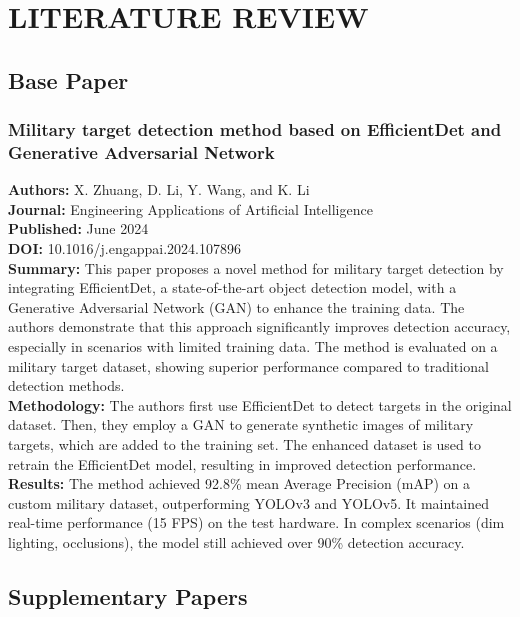 \chapter{LITERATURE REVIEW}\label{ch:literature}

\section{Base Paper}\label{sec:base}
\subsection{Military target detection method based on EfficientDet and Generative Adversarial
  Network}
\textbf{Authors:} X. Zhuang, D. Li, Y. Wang, and K. Li \\
\textbf{Journal:} Engineering Applications of Artificial Intelligence \\
\textbf{Published:} June 2024 \\
\textbf{DOI:} 10.1016/j.engappai.2024.107896 \\

\textbf{Summary:} This paper proposes a novel method for military target detection by integrating
EfficientDet, a state-of-the-art object detection model, with a Generative Adversarial Network (GAN)
to enhance the training data. The authors demonstrate that this approach significantly improves
detection accuracy, especially in scenarios with limited training data. The method is evaluated on a
military target dataset, showing superior performance compared to traditional detection methods. \\

\textbf{Methodology:} The authors first use EfficientDet to detect targets in the original dataset.
Then, they employ a GAN to generate synthetic images of military targets, which are added to the
training set. The enhanced dataset is used to retrain the EfficientDet model, resulting in improved
detection performance. \\

\textbf{Results:} The method achieved 92.8\% mean Average Precision (mAP) on a custom military
dataset, outperforming YOLOv3 and YOLOv5. It maintained real-time performance (15 FPS) on the test
hardware. In complex scenarios (dim lighting, occlusions), the model still achieved over 90\%
detection accuracy.

\label{end:base}
\section{Supplementary Papers}\label{sec:supplementary}

